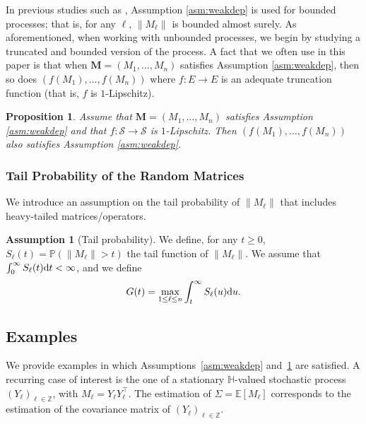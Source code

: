 \documentclass[11pt,a4paper]{article}
\newtheorem{proposition}[theorem]{Proposition}
\theoremstyle{remark}
\theoremstyle{definition}
\newtheorem{assumption}{Assumption}
\theoremstyle{definition}
\newcommand{\Surv}{S}
\newcommand{\rc}{\color{black}}
\begin{document}
\begin{bibunit}[apalike]
In previous studies such as \citep{rio2000inegalites}, Assumption \ref{asm:weakdep} is used for bounded processes; that is, for any $\ell$, $\|M_\ell\|$ is bounded almost surely. As aforementioned, when working with unbounded processes, we begin by studying a truncated and bounded version of the process. A fact that we often use in this paper is that when $\mathbf{M}=(M_1,\dots,M_{n})$ satisfies Assumption \ref{asm:weakdep}, then so does $(f(M_1),\dots,f(M_n))$ where $f:E\rightarrow E$ is an adequate truncation function (that is, $f$ is $1$-Lipschitz).


\begin{proposition}
\label{proposition:lipschitz:dependence}
Assume that  $\mathbf{M}=(M_1,\dots,M_{n})$ satisfies Assumption \ref{asm:weakdep} and that $f:\mathcal{S} \rightarrow \mathcal{S}$ is $1$-Lipschitz. Then $(f(M_1),\dots,f(M_n))$ also satisfies Assumption \ref{asm:weakdep}.
\end{proposition}

\subsubsection{Tail Probability of the Random Matrices}

We introduce an assumption on the tail probability of $\|M_\ell\|$ that includes heavy-tailed matrices/operators.
\begin{assumption}[Tail probability]
\label{asm:tailbound}
We define, for any $t\geq 0$, $\Surv_{\ell}(t) = \mathbb{P}(\|M_\ell\|>t)$ the tail function of $\|M_{\ell}\|$. We assume that {\rc $\int_{0}^{\infty}\Surv_{\ell}(t) {\rm d} t<\infty$}, and we define
\begin{align*}
    G(t) = \max_{1\leq \ell\leq n } \int_{t}^{\infty} \Surv_{\ell}(u) {\rm d} u.
\end{align*}
\end{assumption}

\subsection{Examples} \label{sec:example}

We provide examples in which Assumptions~\ref{asm:weakdep} and~\ref{asm:tailbound} are satisfied. A recurring case of interest is the one of a stationary $\mathbb{H}$-valued stochastic process $(Y_\ell)_{\ell\in\mathbb{Z}}$, with $M_\ell = Y_{\ell} Y_{\ell}^\top $. The estimation of $\Sigma=\mathbb{E}[M_{\ell}]$ corresponds to the estimation of the covariance matrix of $(Y_\ell)_{\ell\in\mathbb{Z}}$.


\end{bibunit}
\end{document}
